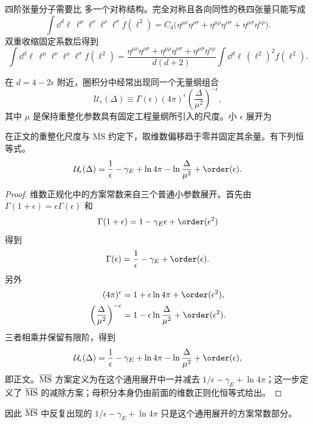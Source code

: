 四阶张量分子需要比 多一个对称结构。完全对称且各向同性的秩四张量只能写成
\begin{equation}
\int\dd^d \ell\,\ell^\mu\ell^\nu\ell^\rho\ell^\sigma f(\ell^2)
=C_4\bigl(
\eta^{\mu\nu}\eta^{\rho\sigma}
+\eta^{\mu\rho}\eta^{\nu\sigma}
+\eta^{\mu\sigma}\eta^{\nu\rho}\bigr).
\label{eq:rank4-isotropic-ansatz-dp68}
\end{equation}
双重收缩固定系数后得到
\begin{equation}
{
\int\dd^d \ell\,
\ell^\mu\ell^\nu\ell^\rho\ell^\sigma f(\ell^2)
=\frac{\eta^{\mu\nu}\eta^{\rho\sigma}
+\eta^{\mu\rho}\eta^{\nu\sigma}
+\eta^{\mu\sigma}\eta^{\nu\rho}}
{d(d+2)}
\int\dd^d \ell\,(\ell^2)^2f(\ell^2).}
\label{eq:rank4-tensor-reduction-dp21}
\end{equation}

在 $d=4-2\epsilon$ 附近，圈积分中经常出现同一个无量纲组合
\begin{equation}
\mathcal U_\epsilon(\Delta)
\equiv\Gamma(\epsilon)(4\pi)^\epsilon
\left(\frac{\Delta}{\mu^2}\right)^{-\epsilon},
\label{eq:dimreg-universal-factor-dp68}
\end{equation}
其中 $\mu$ 是保持重整化参数具有固定工程量纲所引入的尺度。小 $\epsilon$ 展开为
\begin{proposition}
在正文的重整化尺度与 $\overline{\mathrm{MS}}$ 约定下，取维数偏移趋于零并固定其余量。有下列恒等式。
\begin{equation}
{
\mathcal U_\epsilon(\Delta)
=\frac1\epsilon-\gamma_E+\ln4\pi
-\ln\frac{\Delta}{\mu^2}+\order(\epsilon).}
\label{eq:dimreg-universal-expansion-dp68}
\end{equation}
\end{proposition}
\begin{proof}
维数正规化中的方案常数来自三个普通小参数展开。首先由 $\Gamma(1+\epsilon)=\epsilon\Gamma(\epsilon)$ 和
\begin{equation*}
 \Gamma(1+\epsilon)=1-\gamma_E\epsilon+\order(\epsilon^2)
\end{equation*}
得到
\begin{equation*}
 \Gamma(\epsilon)=\frac1\epsilon-\gamma_E+\order(\epsilon).
\end{equation*}
另外
\begin{align*}
 (4\pi)^\epsilon
 &=1+\epsilon\ln4\pi+\order(\epsilon^2),\\
 \left(\frac{\Delta}{\mu^2}\right)^{-\epsilon}
 &=1-\epsilon\ln\frac{\Delta}{\mu^2}+\order(\epsilon^2).
\end{align*}
三者相乘并保留有限阶，得到
\begin{equation*}
 \mathcal U_\epsilon(\Delta)
 =\frac1\epsilon-\gamma_E+\ln4\pi
 -\ln\frac{\Delta}{\mu^2}+\order(\epsilon),
\end{equation*}
即正文。$\overline{\rm MS}$ 方案定义为在这个通用展开中一并减去 $1/\epsilon-\gamma_E+\ln4\pi$；这一步定义了 $\overline{\rm MS}$ 的减除方案；母积分本身仍由前面的维数正则化恒等式给出。
\end{proof}
因此 $\overline{\rm MS}$ 中反复出现的 $1/\epsilon-\gamma_E+\ln4\pi$ 只是这个通用展开的方案常数部分。

